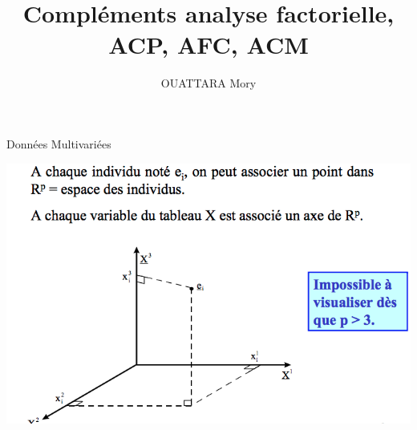 \documentclass[11pt]{beamer}
\author{OUATTARA Mory }
\title{Compléments analyse factorielle, ACP, AFC, ACM}
\institute{CNAM}
\begin{document}
\begin{frame}
\titlepage
\end{frame}

\begin{frame}
\tableofcontents
\end{frame}


 





\begin{frame}{Données Multivariées}

  
\centering 
 \includegraphics[scale=0.45]{Proj1.png} 
 
\end{frame}
\end{document}
